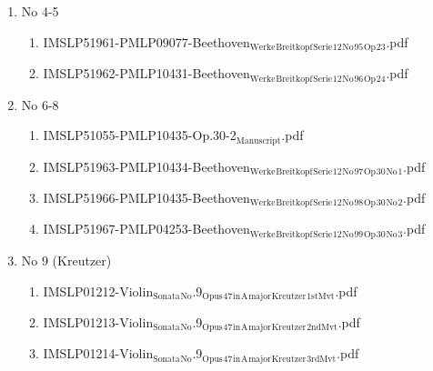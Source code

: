 \documentclass[11pt]{article}
\begin{document}
\begin{enumerate}
\begin{enumerate}
\item No 4-5
\label{sec-1-1-1-1-44-9-12-5}
\begin{enumerate}
\item IMSLP51961-PMLP09077-Beethoven$_{\text{Werke}}$$_{\text{Breitkopf}}$$_{\text{Serie}}$$_{\text{12}}$$_{\text{No}}$$_{\text{95}}$$_{\text{Op}}$$_{\text{23}}$.pdf
\label{sec-1-1-1-1-44-9-12-5-1}

\item IMSLP51962-PMLP10431-Beethoven$_{\text{Werke}}$$_{\text{Breitkopf}}$$_{\text{Serie}}$$_{\text{12}}$$_{\text{No}}$$_{\text{96}}$$_{\text{Op}}$$_{\text{24}}$.pdf
\label{sec-1-1-1-1-44-9-12-5-2}
\end{enumerate}

\item No 6-8
\label{sec-1-1-1-1-44-9-12-6}
\begin{enumerate}
\item IMSLP51055-PMLP10435-Op.30-2$_{\text{Manuscript}}$.pdf
\label{sec-1-1-1-1-44-9-12-6-1}

\item IMSLP51963-PMLP10434-Beethoven$_{\text{Werke}}$$_{\text{Breitkopf}}$$_{\text{Serie}}$$_{\text{12}}$$_{\text{No}}$$_{\text{97}}$$_{\text{Op}}$$_{\text{30}}$$_{\text{No}}$$_{\text{1}}$.pdf
\label{sec-1-1-1-1-44-9-12-6-2}

\item IMSLP51966-PMLP10435-Beethoven$_{\text{Werke}}$$_{\text{Breitkopf}}$$_{\text{Serie}}$$_{\text{12}}$$_{\text{No}}$$_{\text{98}}$$_{\text{Op}}$$_{\text{30}}$$_{\text{No}}$$_{\text{2}}$.pdf
\label{sec-1-1-1-1-44-9-12-6-3}

\item IMSLP51967-PMLP04253-Beethoven$_{\text{Werke}}$$_{\text{Breitkopf}}$$_{\text{Serie}}$$_{\text{12}}$$_{\text{No}}$$_{\text{99}}$$_{\text{Op}}$$_{\text{30}}$$_{\text{No}}$$_{\text{3}}$.pdf
\label{sec-1-1-1-1-44-9-12-6-4}
\end{enumerate}

\item No 9 (Kreutzer)
\label{sec-1-1-1-1-44-9-12-7}
\begin{enumerate}
\item IMSLP01212-Violin$_{\text{Sonata}}$$_{\text{No}}$.9$_{\text{Opus}}$$_{\text{47}}$$_{\text{in}}$$_{\text{A}}$$_{\text{major}}$$_{\text{Kreutzer}}$$_{\text{1stMvt}}$.pdf
\label{sec-1-1-1-1-44-9-12-7-1}

\item IMSLP01213-Violin$_{\text{Sonata}}$$_{\text{No}}$.9$_{\text{Opus}}$$_{\text{47}}$$_{\text{in}}$$_{\text{A}}$$_{\text{major}}$$_{\text{Kreutzer}}$$_{\text{2ndMvt}}$.pdf
\label{sec-1-1-1-1-44-9-12-7-2}

\item IMSLP01214-Violin$_{\text{Sonata}}$$_{\text{No}}$.9$_{\text{Opus}}$$_{\text{47}}$$_{\text{in}}$$_{\text{A}}$$_{\text{major}}$$_{\text{Kreutzer}}$$_{\text{3rdMvt}}$.pdf
\label{sec-1-1-1-1-44-9-12-7-3}
\end{enumerate}
\end{enumerate}
\end{enumerate}
\end{document}
